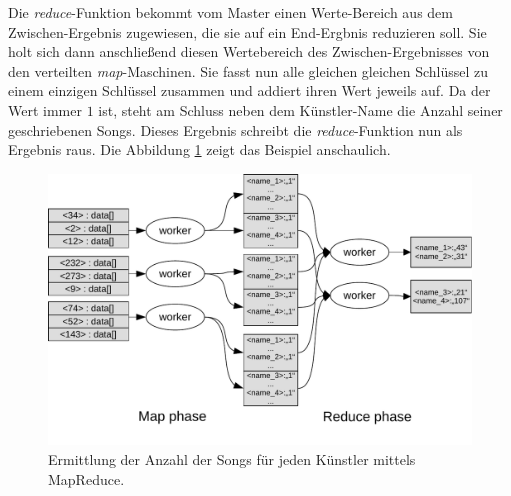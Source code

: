 Die \textit{reduce}-Funktion bekommt vom Master einen Werte-Bereich aus dem Zwischen-Ergebnis zugewiesen, die sie auf
ein End-Ergbnis reduzieren soll. Sie holt sich dann anschließend diesen Wertebereich des Zwischen-Ergebnisses von den verteilten
\textit{map}-Maschinen. Sie fasst nun alle gleichen gleichen Schlüssel zu einem einzigen Schlüssel zusammen und addiert 
ihren Wert jeweils auf. Da der Wert immer $1$ ist, steht am Schluss neben dem Künstler-Name die Anzahl seiner geschriebenen
Songs. Dieses Ergebnis schreibt die  \textit{reduce}-Funktion nun als Ergebnis raus. Die Abbildung \ref{fig:mapreduceExample} zeigt 
das Beispiel anschaulich.

\begin{figure}
\centering
\includegraphics[width=1.0\textwidth]{images/mapreduceExample.pdf}
\caption{Ermittlung der Anzahl der Songs für jeden Künstler mittels MapReduce.}
\label{fig:mapreduceExample}
\end{figure}



